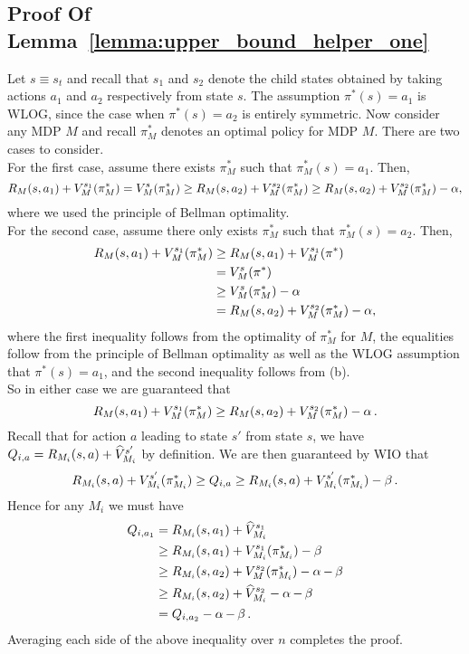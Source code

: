 \documentclass[11pt,twoside]{article}
\begin{document}
\subsection{Proof Of Lemma~\ref{lemma:upper_bound_helper_one}}
\label{app:upper_lem1}
\noindent Let $s \equiv s_t$ and recall that $s_1$ and $s_2$ denote the child states obtained by taking actions $a_1$ and $a_2$ respectively from state $s$. The assumption $\pi^*(s) = a_1$ is WLOG, since the case when $\pi^*(s) = a_2$ is entirely symmetric. Now consider any MDP $M$ and recall $\pi^*_M$ denotes an optimal policy for MDP $M$. There are two cases to consider. \\

\noindent For the first case, assume there exists $\pi^*_M$ such that $\pi^*_M(s) = a_1$. Then,
$$
R_M(s, a_1) + V^{{s_1 }}_{{M }}({\pi^*_{M}}) = V^{{s }}_{{M }}({\pi^*_M}) \geq R_M(s, a_2) + V^{{s_2 }}_{{M }}({\pi^*_{M}}) \geq R_M(s, a_2) + V^{{s_2 }}_{{M }}({\pi^*_{M}}) - \operatorname{\alpha},
$$
where we used the principle of Bellman optimality. \\

\noindent For the second case, assume there only exists $\pi^*_M$ such that $\pi^*_M(s) = a_2$. Then,
\begin{align*}
R_M(s, a_1) + V^{{s_1 }}_{{M }}({\pi^*_M}) &\geq R_M(s, a_1) + V^{{s_1 }}_{{M }}({\pi^*}) \\
&= V^{{s }}_{{M }}({\pi^*}) \\
&\geq V^{{s }}_{{M }}({\pi^*_M}) - \operatorname{\alpha} \\
&= R_M(s, a_2) + V^{{s_2 }}_{{M }}({\pi^*_{M}}) - \operatorname{\alpha},
\end{align*}
where the first inequality follows from the optimality of $\pi^*_M$ for $M$, the equalities follow from the principle of Bellman optimality as well as the WLOG assumption that $\pi^*(s) = a_1$, and the second inequality follows from \strprox{} (b). \\

\noindent So in either case we are guaranteed that
$$
R_M(s, a_1) + V^{{s_1 }}_{{M }}({\pi^*_M}) \geq R_M(s, a_2) + V^{{s_2 }}_{{M }}({\pi^*_{M}}) - \operatorname{\alpha}.
$$
Recall that for action $a$ leading to state $s'$ from state $s$, we have $Q_{i, a} = R_{M_i}(s, a) + \widehat{V}^{{s' }}_{{M_i }}$ by definition. We are then guaranteed by WIO that
$$
R_{M_i}(s, a) + V^{{s' }}_{{M_i }}({\pi^*_{M_i}}) \geq Q_{i, a} \geq R_{M_i}(s, a) + V^{{s' }}_{{M_i }}({\pi^*_{M_i}}) - \operatorname{\beta}.
$$
Hence for any $M_i$ we must have
\begin{align*}
Q_{i, a_1} &= R_{M_i}(s, a_1) + \widehat{V}^{{s_1 }}_{{M_i }} \\
&\geq R_{M_i}(s, a_1) + V^{{s_1 }}_{{M_i }}({\pi^*_{M_i}}) - \operatorname{\beta} \\
&\geq R_{M_i}(s, a_2) + V^{{s_2 }}_{{M }}({\pi^*_{M_i}}) - \operatorname{\alpha} - \operatorname{\beta} \\
&\geq R_{M_i}(s, a_2) + \widehat{V}^{{s_2 }}_{{M_i }} - \operatorname{\alpha} - \operatorname{\beta} \\
&= Q_{i, a_2} - \operatorname{\alpha} - \operatorname{\beta}.
\end{align*}
Averaging each side of the above inequality over $n$ completes the proof.
\end{document}

